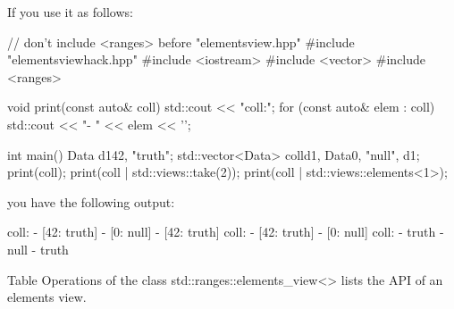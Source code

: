 If you use it as follows:


\begin{cpp}
// don’t include <ranges> before "elementsview.hpp"
#include "elementsviewhack.hpp"
#include <iostream>
#include <vector>
#include <ranges>

void print(const auto& coll)
{
	std::cout << "coll:\n";
	for (const auto& elem : coll) {
		std::cout << "- " << elem << '\n';
	}
}

int main()
{
	Data d1{42, "truth"};
	std::vector<Data> coll{d1, Data{0, "null"}, d1};
	print(coll);
	print(coll | std::views::take(2));
	print(coll | std::views::elements<1>);
}
\end{cpp}

you have the following output:

\begin{shell}
coll:
- [42: truth]
- [0: null]
- [42: truth]
coll:
- [42: truth]
- [0: null]
coll:
- truth
- null
- truth
\end{shell}


Table Operations of the class std::ranges::elements\_view<> lists the API of an elements view.

